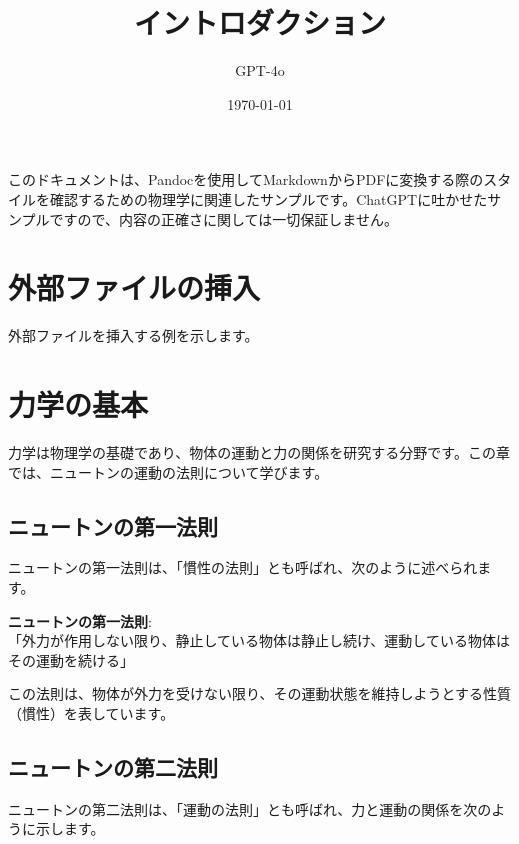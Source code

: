 \documentclass[
  11pt,
  pandoc,
  a4paper,
  pdflatex,
  japaram={jis2004}]{bxjsarticle}
\title{イントロダクション}
\author{GPT-4o}
\date{\today}
\begin{document}
\maketitle

このドキュメントは、Pandocを使用してMarkdownからPDFに変換する際のスタイルを確認するための物理学に関連したサンプルです。ChatGPTに吐かせたサンプルですので、内容の正確さに関しては一切保証しません。

\section{外部ファイルの挿入}\label{ux5916ux90e8ux30d5ux30a1ux30a4ux30ebux306eux633fux5165}

外部ファイルを挿入する例を示します。

\section{力学の基本}\label{ux529bux5b66ux306eux57faux672c}

力学は物理学の基礎であり、物体の運動と力の関係を研究する分野です。この章では、ニュートンの運動の法則について学びます。

\subsection{ニュートンの第一法則}\label{ux30cbux30e5ux30fcux30c8ux30f3ux306eux7b2cux4e00ux6cd5ux5247}

ニュートンの第一法則は、「慣性の法則」とも呼ばれ、次のように述べられます。

\begin{tcolorbox}

\textbf{ニュートンの第一法則}:\\
「外力が作用しない限り、静止している物体は静止し続け、運動している物体はその運動を続ける」

\end{tcolorbox}

この法則は、物体が外力を受けない限り、その運動状態を維持しようとする性質（慣性）を表しています。

\subsection{ニュートンの第二法則}\label{ux30cbux30e5ux30fcux30c8ux30f3ux306eux7b2cux4e8cux6cd5ux5247}

ニュートンの第二法則は、「運動の法則」とも呼ばれ、力と運動の関係を次のように示します。
\end{document}
